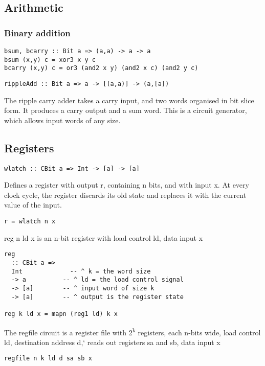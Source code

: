 \documentclass[11pt]{article}
\begin{document}
\subsection{Arithmetic}
\label{sec:orgfdfdfee}

\subsubsection{Binary addition}
\label{sec:org5d218b2}


\begin{verbatim}
bsum, bcarry :: Bit a => (a,a) -> a -> a
bsum (x,y) c = xor3 x y c
bcarry (x,y) c = or3 (and2 x y) (and2 x c) (and2 y c)
\end{verbatim}



\begin{verbatim}
rippleAdd :: Bit a => a -> [(a,a)] -> (a,[a])
\end{verbatim}


The ripple carry adder takes a carry input, and two words organised in
bit slice form.  It produces a carry output and a sum word.  This is a
circuit generator, which allows input words of any size.

\subsection{Registers}
\label{sec:org047a3fe}


\begin{verbatim}
wlatch :: CBit a => Int -> [a] -> [a]
\end{verbatim}


Defines a register with output r, containing n bits, and with input x.
At every clock cycle, the register discards its old state and replaces
it with the current value of the input.


\begin{verbatim}
r = wlatch n x
\end{verbatim}

reg n ld x is an n-bit register with load control ld, data input x

\begin{verbatim}
reg
  :: CBit a =>
  Int             -- ^ k = the word size
  -> a          -- ^ ld = the load control signal
  -> [a]        -- ^ input word of size k
  -> [a]        -- ^ output is the register state

reg k ld x = mapn (reg1 ld) k x
\end{verbatim}

The regfile circuit is a register file with 2\textsuperscript{k} registers, each n-bits
wide, load control ld, destination address d,` reads out registers sa
and sb, data input x

\begin{verbatim}
regfile n k ld d sa sb x 
\end{verbatim}
\end{document}
